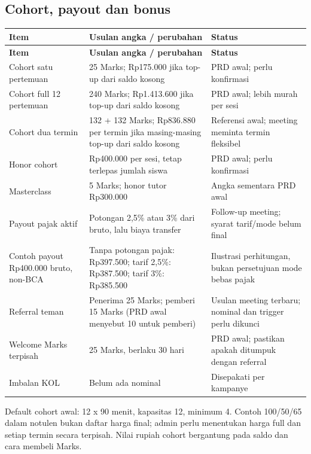 \documentclass[10pt,a4paper]{article}
\begin{document}
\subsection*{Cohort, payout dan bonus}

{\small
\begin{longtable}{L{30.70mm}L{56.55mm}L{74.32mm}}
\hline
\textbf{Item} & \textbf{Usulan angka /\allowbreak{} perubahan} & \textbf{Status} \\ \hline
\endfirsthead
\hline
\textbf{Item} & \textbf{Usulan angka /\allowbreak{} perubahan} & \textbf{Status} \\ \hline
\endhead
Cohort satu pertemuan & 25 Marks; Rp175.000 jika top-up dari saldo kosong & PRD awal; perlu konfirmasi \\ \hline
Cohort full 12 pertemuan & 240 Marks; Rp1.413.600 jika top-up dari saldo kosong & PRD awal; lebih murah per sesi \\ \hline
Cohort dua termin & 132 + 132 Marks; Rp836.880 per termin jika masing-masing top-up dari saldo kosong & Referensi awal; meeting meminta termin fleksibel \\ \hline
Honor cohort & Rp400.000 per sesi, tetap terlepas jumlah siswa & PRD awal; perlu konfirmasi \\ \hline
Masterclass & 5 Marks; honor tutor Rp300.000 & Angka sementara PRD awal \\ \hline
Payout pajak aktif & Potongan 2,5\% atau 3\% dari bruto, lalu biaya transfer & Follow-up meeting; syarat tarif/\allowbreak{}mode belum final \\ \hline
Contoh payout Rp400.000 bruto, non-BCA & Tanpa potongan pajak: Rp397.500; tarif 2,5\%: Rp387.500; tarif 3\%: Rp385.500 & Ilustrasi perhitungan, bukan persetujuan mode bebas pajak \\ \hline
Referral teman & Penerima 25 Marks; pemberi 15 Marks (PRD awal menyebut 10 untuk pemberi) & Usulan meeting terbaru; nominal dan trigger perlu dikunci \\ \hline
Welcome Marks terpisah & 25 Marks, berlaku 30 hari & PRD awal; pastikan apakah ditumpuk dengan referral \\ \hline
Imbalan KOL & Belum ada nominal & Disepakati per kampanye \\ \hline
\end{longtable}
}

Default cohort awal: 12  x  90 menit, kapasitas 12, minimum 4. Contoh 100/\allowbreak{}50/\allowbreak{}65 dalam notulen bukan daftar harga final; admin perlu menentukan harga full dan setiap termin secara terpisah. Nilai rupiah cohort bergantung pada saldo dan cara membeli Marks.
\end{document}
